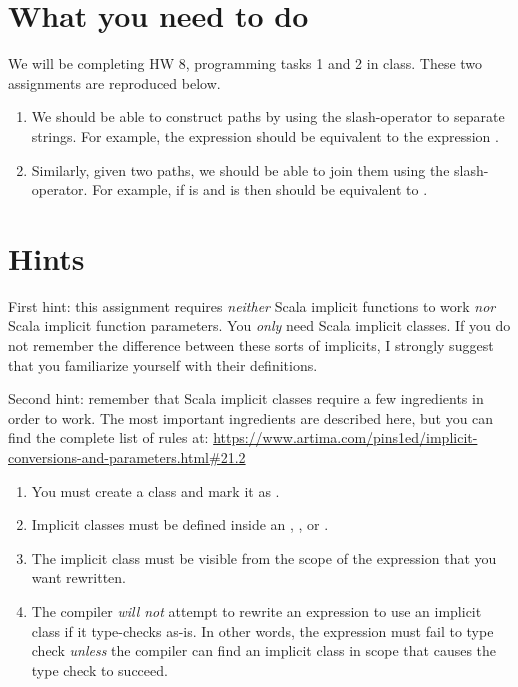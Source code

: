 \documentclass[9pt]{extbook}
\begin{document}
\section{What you need to do}

We will be completing HW 8, programming tasks 1 and 2 in class.  These two assignments are reproduced below.

\begin{enumerate}

  \item We should be able to construct paths by using the slash-operator to separate strings. For example, the expression  should be equivalent to the expression . 
  \item Similarly, given two paths, we should be able to join them using the slash-operator. For example, if  is  and  is  then  should be equivalent to . 
\end{enumerate}

\section{Hints}

First hint: this assignment requires \emph{neither} Scala implicit functions to work \emph{nor} Scala implicit function parameters.  You \emph{only} need Scala implicit classes.  If you do not remember the difference between these sorts of implicits, I strongly suggest that you familiarize yourself with their definitions.

Second hint: remember that Scala implicit classes require a few ingredients in order to work.  The most important ingredients are described here, but you can find the complete list of rules at: \url{https://www.artima.com/pins1ed/implicit-conversions-and-parameters.html#21.2}

\begin{enumerate}
  \item You must create a class and mark it as .
  \item Implicit classes must be defined inside an , , or .
  \item The implicit class must be visible from the scope of the expression that you want rewritten.
  \item The compiler \emph{will not} attempt to rewrite an expression to use an implicit class if it type-checks as-is.  In other words, the expression must fail to type check \emph{unless} the compiler can find an implicit class in scope that causes the type check to succeed.
\end{enumerate}
\end{document}
